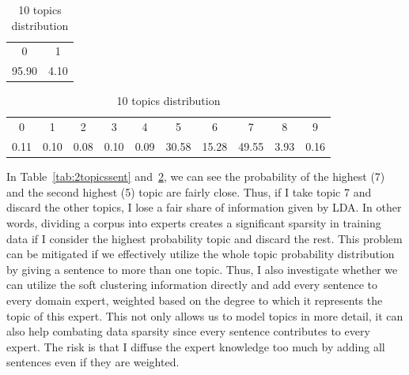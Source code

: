 { %
\begin{table}[!htb]
\centering

\caption{2 topics distribution}
\begin{tabular}{cc}
\\ \hline
0 & 1 \\
95.90 & 4.10 \\ \hline
\end{tabular}
\label{tab:2topicssent}

\caption{10 topics distribution
}
\begin{tabular}{cccccccccc}
\\ \hline

0 & \multicolumn{1}{c}{1} & \multicolumn{1}{c}{2} & \multicolumn{1}{c}{3} & \multicolumn{1}{c}{4} & \multicolumn{1}{c}{5} & \multicolumn{1}{c}{6} & \multicolumn{1}{c}{7} & \multicolumn{1}{c}{8} & \multicolumn{1}{c}{9} \\
0.11 & 0.10 & 0.08 & 0.10 & 0.09 & 30.58 & 15.28 & 49.55 & 3.93 & 0.16 \\ \hline
\end{tabular}
\label{tab:10topicssent}

\end{table}
 
In Table~\ref{tab:2topicssent} and~\ref{tab:10topicssent}, we can see the probability of the highest (7) and the second highest (5) topic are fairly close. Thus, if I take topic 7 and discard the other topics, I lose a fair share of information given by LDA. In other words, dividing a corpus into experts creates a significant sparsity in training data if I consider the highest probability topic and discard the rest.
This problem can be mitigated if we effectively utilize the whole topic probability distribution by giving a sentence to more than one topic. Thus, I also investigate whether we can utilize the soft clustering information directly and add every sentence to every domain expert, weighted based on the degree to which it represents the topic of this expert. This not only allows us to model topics in more detail, it can also help combating data sparsity since every sentence contributes to every expert. The risk is that I diffuse the expert knowledge too much by adding all sentences even if they are weighted. 
}

